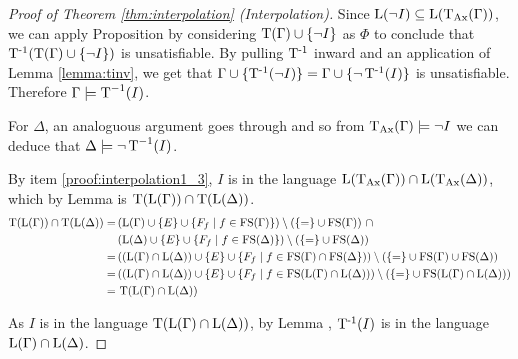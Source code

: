 \begin{proof}[Proof of Theorem \ref{thm:interpolation} (Interpolation)]
			Since $\operatorname{L}(\lnot I) \subseteq \operatorname{L}(\operatorname{\operatorname{T}_{Ax}}(\Gamma))$, we can apply Proposition
			by considering $\operatorname{T}(\Gamma) \cup \{\lnot I\}$ as $\Phi$ to conclude that $\operatorname{T^{-1}}(\operatorname{T}(\Gamma) \cup \{\lnot I\})$ is unsatisfiable. By pulling $\operatorname{T^{-1}}$ inward and an application of Lemma \ref{lemma:tinv}, we get that $\Gamma \cup \{\operatorname{T^{-1}}(\lnot I)\} = \Gamma \cup \{\lnot \operatorname{T^{-1}}(I)\}$ is unsatisfiable. 
			Therefore $\Gamma \models \operatorname{T}^{-1}(I)$.

			For $\Delta$, an analoguous argument goes through and so from $\operatorname{\operatorname{T}_{Ax}}(\Gamma) \models \lnot I$ we can deduce that $\Delta \models \lnot \operatorname{T}^{-1}(I)$.

			By item \ref{proof:interpolation1_3}, $I$ is in the language $\operatorname{L}(\operatorname{\operatorname{T}_{Ax}}(\Gamma)) \cap \operatorname{L}(\operatorname{\operatorname{T}_{Ax}}(\Delta))$, which by Lemma  is $\Trans(\Lang(\Gamma)) \cap\nolinebreak \Trans(\Lang(\Delta)) $. 
			\begin{align*}
				\Trans(\Lang(\Gamma)) \cap\nolinebreak \Trans(\Lang(\Delta)) =\,&
				(\Lang(\Gamma)\cup \{E\}\cup\{F_f\mid f \in \FS(\Gamma)\}) \setminus(\{=\nolinebreak \} \cup\nolinebreak \FS(\Gamma))~\cap \\
				& (\Lang(\Delta)\cup \{E\}\cup\{F_f\mid f \in \FS(\Delta)\}) \setminus(\{=\nolinebreak \} \cup\nolinebreak \FS(\Delta))\\
				=\,& ((\Lang(\Gamma) \cap \Lang(\Delta)) \cup \{E\} \cup\{F_f\mid f \in \FS(\Gamma)\cap\FS(\Delta\}))  \setminus(\{=\} \cup \FS(\Gamma) \cup \FS(\Delta)) \\
				=\,& ((\Lang(\Gamma) \cap \Lang(\Delta)) \cup \{E\} \cup \{F_f\mid f\in \FS( \Lang(\Gamma) \cap \Lang(\Delta)) ) \setminus ( \{=\} \cup \FS(\Lang(\Gamma) \cap \Lang(\Delta)) )  \\ 
				=\,& \Trans(\Lang(\Gamma) \cap \Lang(\Delta))
			\end{align*}

			As $I$ is in the language $\operatorname{T}(\operatorname{L}(\Gamma) \cap \operatorname{L}(\Delta))$, by Lemma , $\operatorname{T^{-1}}(I)$ is in the language $\operatorname{L}(\Gamma) \cap \operatorname{L}(\Delta)$.
		\end{proof}


